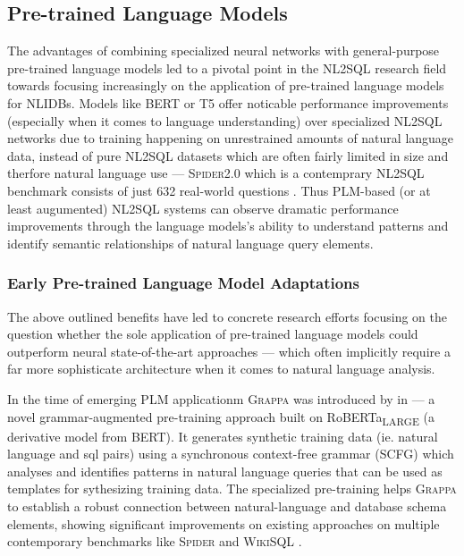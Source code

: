 \subsection{Pre-trained Language Models}


The advantages of combining specialized neural networks with general-purpose pre-trained language models
led to a pivotal point in the NL2SQL research field towards focusing increasingly on the application of pre-trained
language models for NLIDBs. Models like BERT or T5 offer noticable performance improvements (especially when it
comes to language understanding) over specialized NL2SQL networks due to training happening on unrestrained amounts
of natural language data, instead of pure NL2SQL datasets which are often fairly limited in size and therfore natural
language use — \textsc{Spider2.0} which is a contemprary NL2SQL benchmark consists of just 632 real-world questions 
\citep{Spider2}. Thus PLM-based (or at least augumented) NL2SQL systems can observe dramatic performance improvements
through the language models's ability to understand patterns and identify semantic relationships of natural language
query elements. 

\subsubsection{Early Pre-trained Language Model Adaptations}

The above outlined benefits have led to concrete research efforts focusing on the question whether the sole application
of pre-trained language models could outperform neural state-of-the-art approaches — which often implicitly require
a far more sophisticate architecture when it comes to natural language analysis.

In the time of emerging PLM applicationm \textsc{Grappa} was introduced by \citeauthor*{GRAPPA} in \citeyear{GRAPPA} —
a novel grammar-augmented pre-training approach built on RoBERTa\textsubscript{\tiny{LARGE}} (a derivative model from BERT).
It generates synthetic training data (ie. natural language and sql pairs) using a synchronous context-free grammar (SCFG)
which analyses and identifies patterns in natural language queries that can be used as templates for sythesizing training
data. The specialized pre-training helps \textsc{Grappa} to establish a robust connection between natural-language and
database schema elements, showing significant improvements on existing approaches on multiple contemporary benchmarks like 
\textsc{Spider} and \textsc{WikiSQL} \citep{GRAPPA}.


